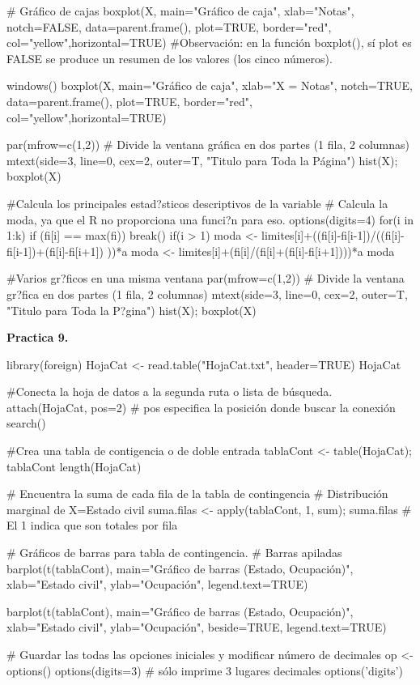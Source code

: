 \documentclass{article}
\begin{document}
# Gráfico de cajas
boxplot(X, main="Gráfico de caja", xlab="Notas", notch=FALSE,
data=parent.frame(), plot=TRUE, border="red", col="yellow",horizontal=TRUE)
#Observación: en la función boxplot(), sí plot es FALSE se produce un resumen de los valores (los cinco números).


windows()
boxplot(X, main="Gráfico de caja", xlab="X = Notas", notch=TRUE,
data=parent.frame(), plot=TRUE, border="red", col="yellow",horizontal=TRUE)

par(mfrow=c(1,2)) # Divide la ventana gráfica en dos partes (1 fila, 2 columnas)
mtext(side=3, line=0, cex=2, outer=T, "Titulo para Toda la Página")
hist(X); boxplot(X)

#Calcula los principales estad?sticos descriptivos de la variable
# Calcula la moda, ya que el R no proporciona una funci?n para eso.
options(digits=4)
for(i in 1:k) if (fi[i] == max(fi)) break()
if(i > 1) moda <- limites[i]+((fi[i]-fi[i-1])/((fi[i]-fi[i-1])+(fi[i]-fi[i+1]) ))*a
moda <- limites[i]+(fi[i]/(fi[i]+(fi[i]-fi[i+1])))*a
moda

#Varios gr?ficos en una misma ventana
par(mfrow=c(1,2)) # Divide la ventana gr?fica en dos partes (1 fila, 2 columnas)
mtext(side=3, line=0, cex=2, outer=T, "Titulo para Toda la P?gina")
hist(X); boxplot(X)




\textbf{Practica 9.}


library(foreign)
HojaCat <- read.table("HojaCat.txt", header=TRUE)
HojaCat


#Conecta la hoja de datos a la segunda ruta o lista de búsqueda.
attach(HojaCat, pos=2) # pos especifica la posición donde buscar la conexión
search()

#Crea una tabla de contigencia o de doble entrada
tablaCont <- table(HojaCat); tablaCont
length(HojaCat)


# Encuentra la suma de cada fila de la tabla de contingencia
# Distribución marginal de X=Estado civil
suma.filas <- apply(tablaCont, 1, sum); suma.filas
# El 1 indica que son totales por fila

# Gráficos de barras para tabla de contingencia.
# Barras apiladas
barplot(t(tablaCont), main="Gráfico de barras (Estado, Ocupación)", xlab="Estado civil", ylab="Ocupación", legend.text=TRUE)

barplot(t(tablaCont), main="Gráfico de barras (Estado, Ocupación)", xlab="Estado civil", ylab="Ocupación", beside=TRUE, legend.text=TRUE)

# Guardar las todas las opciones iniciales y modificar número de decimales
op <- options()
options(digits=3) # sólo imprime 3 lugares decimales
options('digits')
\end{document}
